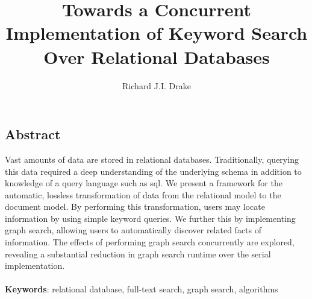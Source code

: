 \documentclass[grad,openright]{uoit-thesis}
\author{Richard J.I. Drake}
\title{Towards a Concurrent Implementation of Keyword Search Over Relational Databases}
\begin{document}
	
	
	
	\begin{preliminary}
		\maketitle

		\setcounter{page}{3}
		
		\chapter*{Abstract}
			Vast amounts of data are stored in relational databases.  Traditionally, querying this data required a deep understanding of the underlying schema in addition to knowledge of a query language such as \gls{sql}.  We present a framework for the automatic, lossless transformation of data from the relational model to the document model.    By performing this transformation, users may locate information by using simple keyword queries.  We further this by implementing graph search, allowing users to automatically discover related facts of information.  The effects of performing graph search concurrently are explored, revealing a substantial reduction in graph search runtime over the serial implementation.
			\\ \\
			\textbf{Keywords}:  relational database, full-text search, graph search, algorithms

		\tableofcontents
		
		\listoftables
		
		\listoffigures
		
		\listofalgorithms
		
		\printglossaries
	\end{preliminary}
	
	
	
	
	
	
	
	
	
	
	

	\appendix
	
	\begin{singlespaced}
		
	\end{singlespaced}
	
	
	
	\printbibliography
\end{document}
